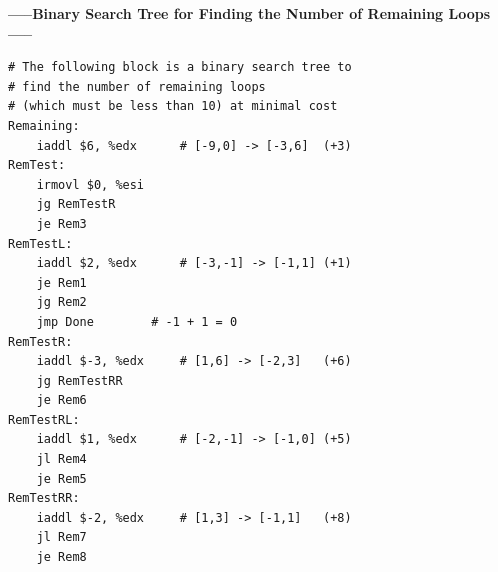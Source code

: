 \documentclass{article}
\begin{document}
\begin{center}
        \textbf{-----Binary Search Tree for Finding the Number of Remaining Loops-----}\\
\end{center}
\begin{lstlisting}
# The following block is a binary search tree to 
# find the number of remaining loops 
# (which must be less than 10) at minimal cost
Remaining:
	iaddl $6, %edx		# [-9,0] -> [-3,6]	(+3)
RemTest:
	irmovl $0, %esi
	jg RemTestR
	je Rem3
RemTestL:
	iaddl $2, %edx		# [-3,-1] -> [-1,1]	(+1)
	je Rem1
	jg Rem2
	jmp Done		# -1 + 1 = 0
RemTestR:
	iaddl $-3, %edx		# [1,6] -> [-2,3]	(+6)
	jg RemTestRR
	je Rem6
RemTestRL:
	iaddl $1, %edx		# [-2,-1] -> [-1,0]	(+5)
	jl Rem4
	je Rem5
RemTestRR:
	iaddl $-2, %edx		# [1,3] -> [-1,1]	(+8)
	jl Rem7
	je Rem8
\end{lstlisting}
\end{document}
